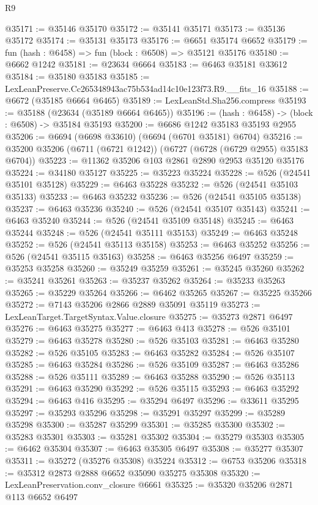 \begin{lexlean}{R9}
\begin{coremodule}
@35171 := @35146 @35170
@35172 := @35141 @35171
@35173 := @35136 @35172
@35174 := @35131 @35173
@35176 := @6651 @35174 @6652
@35179 := fun (hash : @6458) => fun (block : @6508) => @35121 @35176
@35180 := @6662 @1242
@35181 := @23634 @6664
@35183 := @6463 @35181 @33612
@35184 := @35180 @35183
@35185 := LexLeanPreserve.Cc265348943ac75b534ad14c10e123f73.R9.__fits_16
@35188 := @6672 (@35185 @6664 @6465)
@35189 := LexLeanStd.Sha256.compress
@35193 := @35188 (@23634 (@35189 @6664 @6465))
@35196 := (hash : @6458) -> (block : @6508) -> @35184 @35193
@35200 := @6686 @1242 @35183 @35193 @2955
@35206 := @6694 (@6698 @33610) (@6694 (@6701 @35181) @6704)
@35216 := @35200 @35206 (@6711 (@6721 @1242)) (@6727 (@6728 (@6729 @2955) @35183 @6704))
@35223 := @11362 @35206 @103 @2861 @2890 @2953 @35120 @35176
@35224 := @34180 @35127
@35225 := @35223 @35224
@35228 := @526 (@24541 @35101 @35128)
@35229 := @6463 @35228
@35232 := @526 (@24541 @35103 @35133)
@35233 := @6463 @35232
@35236 := @526 (@24541 @35105 @35138)
@35237 := @6463 @35236
@35240 := @526 (@24541 @35107 @35143)
@35241 := @6463 @35240
@35244 := @526 (@24541 @35109 @35148)
@35245 := @6463 @35244
@35248 := @526 (@24541 @35111 @35153)
@35249 := @6463 @35248
@35252 := @526 (@24541 @35113 @35158)
@35253 := @6463 @35252
@35256 := @526 (@24541 @35115 @35163)
@35258 := @6463 @35256 @6497
@35259 := @35253 @35258
@35260 := @35249 @35259
@35261 := @35245 @35260
@35262 := @35241 @35261
@35263 := @35237 @35262
@35264 := @35233 @35263
@35265 := @35229 @35264
@35266 := @6462 @35265
@35267 := @35225 @35266
@35272 := @7143 @35206 @2866 @2889 @35091 @35119
@35273 := LexLeanTarget.TargetSyntax.Value.closure
@35275 := @35273 @2871 @6497
@35276 := @6463 @35275
@35277 := @6463 @413
@35278 := @526 @35101
@35279 := @6463 @35278
@35280 := @526 @35103
@35281 := @6463 @35280
@35282 := @526 @35105
@35283 := @6463 @35282
@35284 := @526 @35107
@35285 := @6463 @35284
@35286 := @526 @35109
@35287 := @6463 @35286
@35288 := @526 @35111
@35289 := @6463 @35288
@35290 := @526 @35113
@35291 := @6463 @35290
@35292 := @526 @35115
@35293 := @6463 @35292
@35294 := @6463 @416
@35295 := @35294 @6497
@35296 := @33611 @35295
@35297 := @35293 @35296
@35298 := @35291 @35297
@35299 := @35289 @35298
@35300 := @35287 @35299
@35301 := @35285 @35300
@35302 := @35283 @35301
@35303 := @35281 @35302
@35304 := @35279 @35303
@35305 := @6462 @35304
@35307 := @6463 @35305 @6497
@35308 := @35277 @35307
@35311 := @35272 (@35276 @35308) @35224
@35312 := @6753 @35206
@35318 := @35312 @2873 @2888 @6652 @35090 @35275 @35308
@35320 := LexLeanPreservation.conv_closure @6661
@35325 := @35320 @35206 @2871 @113 @6652 @6497

\end{coremodule}
\end{lexlean}
